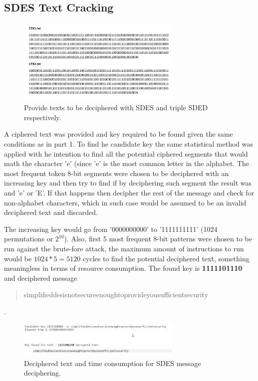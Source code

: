 \documentclass[letterpaper,12pt]{article}
\begin{document}
\subsection{SDES Text Cracking}
\begin{figure}[H]
    \centering
    \includegraphics[width=0.7\textwidth]{assets/CipherText.png}
    \caption{Provide texts to be deciphered with SDES and triple SDED respectively.}
\end{figure}
A ciphered text was provided and key required to be found given the same conditions as in part 1. To find he candidate key the same statistical method was applied with he intention to find all the potential ciphered segments that would math the character 'e' (since 'e' is the most common letter in the alphabet. The most frequent token 8-bit segments were chosen to be deciphered with an increasing key and then try to find if by deciphering such segment the result was and 'e' or 'E'. If that happens then decipher the rest of the message and check for non-alphabet characters, which in such case would be assumed to be an invalid deciphered text and discarded.

The increasing key would go from '0000000000' to '1111111111' (1024 permutations or $2^{10}$). Also, first 5 most frequent 8-bit patterns were chosen to be run against the brute-fore attack, the maximum amount of instructions to run would be $1024*5=5120$ cycles to find the potential deciphered text, something meaningless in terms of resource consumption. The found key is  \textbf{1111101110} and deciphered message \begin{quote}simplifieddesisnotsecureenoughtoprovideyousufficientsecurity\end{quote}. 

\begin{figure}[H]
    \centering
    \includegraphics[width=0.7\textwidth]{assets/SDESCrack.png}
    \caption{Deciphered text and time consumption for SDES message deciphering.}
\end{figure}
\end{document}
